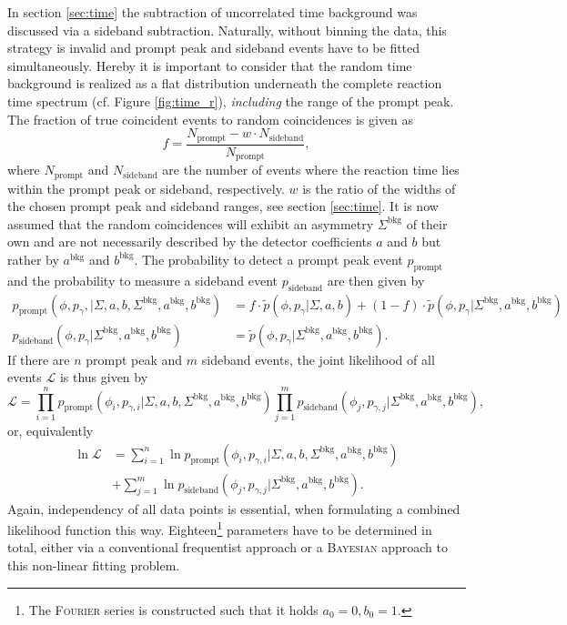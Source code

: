 In section \ref{sec:time} the subtraction of uncorrelated time background was discussed via a sideband subtraction. Naturally, without binning the data, this strategy is invalid and prompt peak and sideband events have to be fitted simultaneously. Hereby it is important to consider that the random time background is realized as a flat distribution underneath the complete reaction time spectrum (cf. Figure \ref{fig:time_r}), \emph{including} the range of the prompt peak. The fraction of true coincident events to random coincidences is given as \begin{equation}
	f=\frac{N_\text{prompt}-w\cdot N_\text{sideband}}{N_\text{prompt}},
\end{equation}
where $N_\text{prompt}$ and $N_\text{sideband}$ are the number of events where the reaction time lies within the prompt peak or sideband, respectively. $w$ is the ratio of the widths of the chosen prompt peak and sideband
ranges, see section \ref{sec:time}. It is now assumed that the random coincidences will exhibit an asymmetry $\Sigma^\text{bkg}$ of their own and are not necessarily described by the detector coefficients $a$ and $b$ but rather by $a^\text{bkg}$ and $b^\text{bkg}$. The probability to detect a prompt peak event $p_\text{prompt}$ and the probability to measure a sideband event $p_\text{sideband}$ are then given by 
\begin{align}
p_\text{prompt}\left(\phi,p_\gamma,\big|\Sigma,a,b,\Sigma^\text{bkg},a^\text{bkg},b^\text{bkg}\right)&=f\cdot\tilde{p}\left(\phi,p_\gamma\big|\Sigma,a,b\right)+\left(1-f\right)\cdot\tilde{p}\left(\phi,p_\gamma\big|\Sigma^\text{bkg},a^\text{bkg},b^\text{bkg}\right)\label{eq:pprmpt}\\
p_\text{sideband}\left(\phi,p_\gamma\big|\Sigma^\text{bkg},a^\text{bkg},b^\text{bkg}\right)&=\tilde{p}\left(\phi,p_\gamma\big|\Sigma^\text{bkg},a^\text{bkg},b^\text{bkg}\right)\label{eq:pside}.
\end{align}
If there are $n$ prompt peak and $m$ sideband events, the joint likelihood of all events $\mathcal{L}$ is thus given by
\begin{equation}
	\mathcal{L}=\prod_{i=1}^{n}p_\text{prompt}\left(\phi_i,p_{\gamma,i}\big|\Sigma,a,b,\Sigma^\text{bkg},a^\text{bkg},b^\text{bkg}\right)\prod_{j=1}^mp_\text{sideband}\left(\phi_j,p_{\gamma,j}\big|\Sigma^\text{bkg},a^\text{bkg},b^\text{bkg}\right),
\end{equation}
or, equivalently
\begin{equation}
\begin{aligned}
	\ln\mathcal{L}&=\sum_{i=1}^{n}\ln p_\text{prompt}\left(\phi_i,p_{\gamma,i}\big|\Sigma,a,b,\Sigma^\text{bkg},a^\text{bkg},b^\text{bkg}\right)\\&+\sum_{j=1}^m \ln p_\text{sideband}\left(\phi_j,p_{\gamma,j}\big|\Sigma^\text{bkg},a^\text{bkg},b^\text{bkg}\right).\label{eq:lik}
\end{aligned}
\end{equation}
Again, independency of all data points is essential, when formulating a combined likelihood function this way.
Eighteen\footnote{The \textsc{Fourier} series is constructed such that it holds $a_0=0,b_0=1$.} parameters have to be determined in total, either via a conventional frequentist approach or a \textsc{Bayesian} approach to this non-linear fitting problem.
